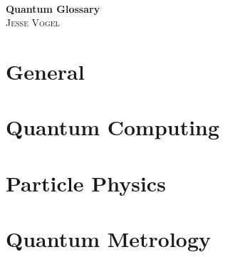 \documentclass[10pt]{report}
\begin{document}
\thispagestyle{empty}

\begin{center}
    \; \\ \vspace{4cm} \textbf{\Huge Quantum Glossary}
    \\ \vspace{2cm}
    \textsc{Jesse Vogel}
\end{center}

\newpage

{
    \tableofcontents
}

\newcommand{\cat}{}

\chapter{General}
\renewcommand{\cat}{GEN}


\chapter{Quantum Computing}
\renewcommand{\cat}{COM}




\chapter{Particle Physics}
\renewcommand{\cat}{PAR}


\chapter{Quantum Metrology}
\renewcommand{\cat}{MET}

\end{document}
